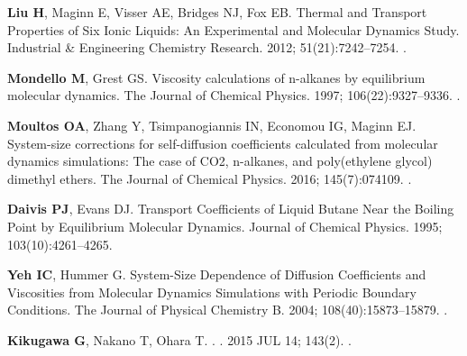 \documentclass[9pt,bestpractices]{livecoms}
\begin{document}
\begin{thebibliography}{61}
	\textbf{\color{LiveCoMSMediumGrey} Liu H}, Maginn E, Visser AE, Bridges NJ, Fox
	EB.
	\newblock Thermal and Transport Properties of Six Ionic Liquids: An
	Experimental and Molecular Dynamics Study.
	\newblock Industrial \& Engineering Chemistry Research.  2012;
	51(21):7242--7254.
	\newblock \href{https://dx.doi.org/10.1021/ie300222a}{\doiprefix
		}.
	
	\textbf{\color{LiveCoMSMediumGrey} Mondello M}, Grest GS.
	\newblock Viscosity calculations of n-alkanes by equilibrium molecular
	dynamics.
	\newblock The Journal of Chemical Physics.  1997; 106(22):9327--9336.
	\newblock \href{https://dx.doi.org/10.1063/1.474002}{\doiprefix
		}.
	
	\textbf{\color{LiveCoMSMediumGrey} Moultos OA}, Zhang Y, Tsimpanogiannis IN,
	Economou IG, Maginn EJ.
	\newblock System-size corrections for self-diffusion coefficients calculated
	from molecular dynamics simulations: The case of CO2, n-alkanes, and
	poly(ethylene glycol) dimethyl ethers.
	\newblock The Journal of Chemical Physics.  2016; 145(7):074109.
	\newblock \href{https://dx.doi.org/10.1063/1.4960776}{\doiprefix
		}.
	
	\textbf{\color{LiveCoMSMediumGrey} Daivis PJ}, Evans DJ.
	\newblock Transport Coefficients of Liquid Butane Near the Boiling Point by
	Equilibrium Molecular Dynamics.
	\newblock Journal of Chemical Physics.  1995; 103(10):4261--4265.
	
	\textbf{\color{LiveCoMSMediumGrey} Yeh IC}, Hummer G.
	\newblock System-Size Dependence of Diffusion Coefficients and Viscosities from
	Molecular Dynamics Simulations with Periodic Boundary Conditions.
	\newblock The Journal of Physical Chemistry B.  2004; 108(40):15873--15879.
	\newblock \href{https://dx.doi.org/10.1021/jp0477147}{\doiprefix
		}.
	
	\textbf{\color{LiveCoMSMediumGrey} Kikugawa G}, Nakano T, Ohara T.
	.
	.  {2015} {JUL 14}; {143}({2}).
	\newblock \href{https://dx.doi.org/{10.1063/1.4926841}}{\doiprefix
		}.
	

\end{thebibliography}
\end{document}
